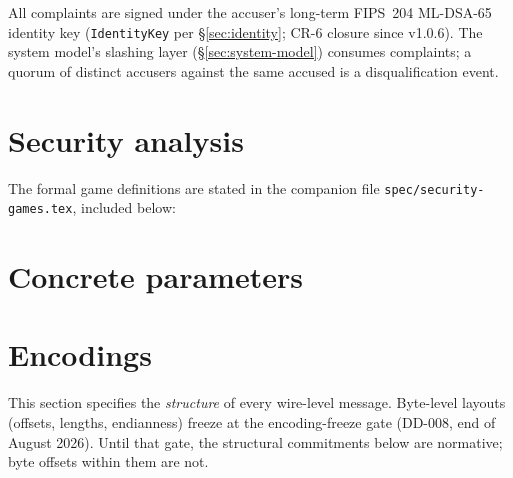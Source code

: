 \documentclass[11pt,a4paper]{article}
\theoremstyle{definition}
\theoremstyle{remark}
\begin{document}
All complaints are signed under the accuser's long-term FIPS~204
ML-DSA-65 identity key (\texttt{IdentityKey} per
\S\ref{sec:identity}; CR-6 closure since v1.0.6). The system model's
slashing layer (\S\ref{sec:system-model}) consumes complaints; a
quorum of distinct accusers against the same accused is a
disqualification event.

\section{Security analysis}
\label{sec:security}

The formal game definitions are stated in the companion file
\texttt{spec/security-games.tex}, included below:



\section{Concrete parameters}
\label{sec:parameters}



\section{Encodings}
\label{sec:encodings}

This section specifies the \emph{structure} of every wire-level
message. Byte-level layouts (offsets, lengths, endianness) freeze at
the encoding-freeze gate (DD-008, end of August 2026). Until that
gate, the structural commitments below are normative; byte offsets
within them are not.
\end{document}

